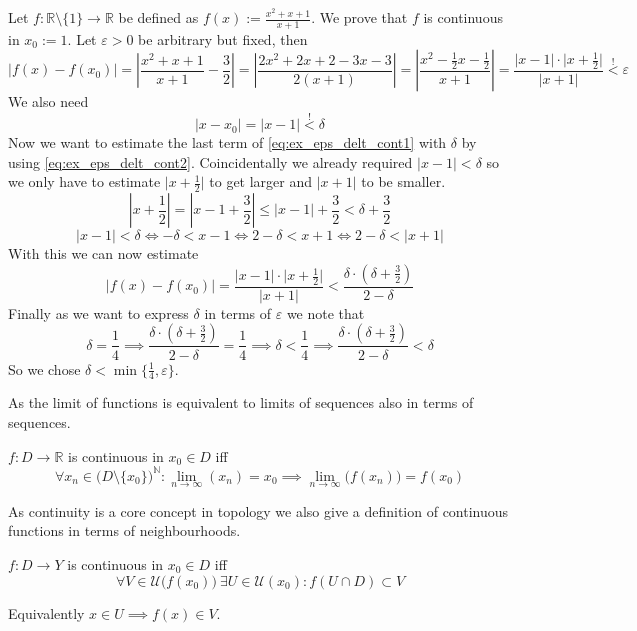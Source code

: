 \begin{example}
   Let \(f: \mathbb{R}\setminus\{1\} \to \mathbb{R}\) be defined as \(f(x) := \frac{x^2+x+1}{x+1}\).
   We prove that \(f\) is continuous in \(x_0 := 1\).
   Let \(\varepsilon > 0\) be arbitrary but fixed, then
   \begin{equation}\label{eq:ex_eps_delt_cont1}
      \lvert f(x) - f(x_0)\rvert = \left\lvert\frac{x^2+x+1}{x+1} - \frac{3}{2}\right\rvert = \left\lvert \frac{2x^2+2x+2-3x-3}{2(x+1)}\right\rvert = \left\lvert\frac{x^2-\frac{1}{2}x - \frac{1}{2}}{x+1}\right\rvert = \frac{\lvert x-1\rvert \cdot \lvert x+\frac{1}{2}\rvert}{\lvert x+1\rvert} \overset{!}{<} \varepsilon
   \end{equation}
   We also need
   \begin{equation}\label{eq:ex_eps_delt_cont2}
      \lvert x - x_0 \rvert = \lvert x - 1\rvert \overset{!}{<} \delta
   \end{equation}
   Now we want to estimate the last term of \cref{eq:ex_eps_delt_cont1} with \(\delta\) by using \cref{eq:ex_eps_delt_cont2}.
   Coincidentally we already required \(\lvert x - 1\rvert < \delta\) so we only have to estimate \(\lvert x + \frac{1}{2}\rvert\) to get larger and \(\lvert x + 1\rvert\) to be smaller.
   \[\left\lvert x + \frac{1}{2}\right\rvert = \left\lvert x - 1 + \frac{3}{2}\right\rvert \leq \lvert x - 1 \rvert + \frac{3}{2} < \delta + \frac{3}{2}\]
   \[\lvert x - 1\lvert < \delta \iff -\delta < x - 1 \iff 2-\delta < x+1 \iff 2-\delta < \lvert x+1\rvert\]
   With this we can now estimate
   \[\lvert f(x) - f(x_0)\rvert = \frac{\lvert x-1\rvert \cdot \lvert x+\frac{1}{2}\rvert}{\lvert x+1\rvert} < \frac{\delta \cdot (\delta + \frac{3}{2})}{2-\delta}\]
   Finally as we want to express \(\delta\) in terms of \(\varepsilon\) we note that
   \[\delta = \frac{1}{4} \implies \frac{\delta \cdot (\delta + \frac{3}{2})}{2-\delta} = \frac{1}{4} \implies \delta < \frac{1}{4} \implies \frac{\delta \cdot (\delta + \frac{3}{2})}{2-\delta} < \delta\]
   So we chose \(\delta < \min\{\frac{1}{4}, \varepsilon\}\).
\end{example}
As the limit of functions is equivalent to limits of sequences also in terms of sequences.
\begin{definition}\label{def:seq_cont}
   \(f: D \to \mathbb{R}\) is continuous in \(x_0 \in D\) iff
   \[\forall x_n \in \big(D\setminus\{x_0\}\big)^\mathbb{N}: \lim_{n \to \infty}(x_n) = x_0 \implies \lim_{n \to \infty}\big(f(x_n)\big) = f(x_0)\]
\end{definition}
As continuity is a core concept in topology we also give a definition of continuous functions in terms of neighbourhoods.
\begin{definition}\label{def:neigh_cont}
   \(f: D \to Y\) is continuous in \(x_0 \in D\) iff
   \[\forall V \in \mathcal{U}\big(f(x_0)\big)~\exists U \in \mathcal{U}(x_0): f(U \cap D) \subset V\]
\end{definition}
\begin{remark}
   Equivalently \(x \in U \implies f(x) \in V\).
\end{remark}

